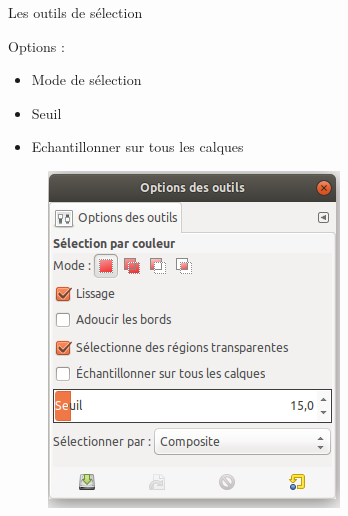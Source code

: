 \begin{frame}{Les outils de sélection}
\begin{overprint}
\begin{enumerate}
{			\vspace{0.3cm}
			\begin{minipage}[t]{0.55\textwidth}
				Options :

				\begin{itemize}
					\item Mode de sélection
					\item Seuil
					\item Echantillonner sur tous les calques
				\end{itemize}
			\end{minipage}
			\begin{minipage}[t]{0.35\textwidth}

				\begin{figure}
			    		\centering
			    		\includegraphics[width=\textwidth]{Images/opt_color_select}
				\end{figure}
			\end{minipage}
	}
\end{enumerate}
\end{overprint}
\end{frame}
